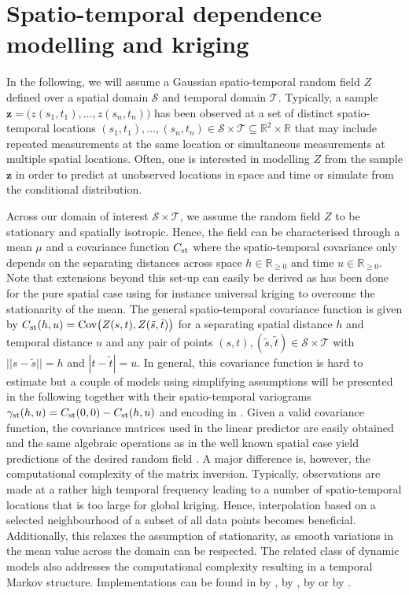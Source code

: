 \section{Spatio-temporal dependence modelling and kriging}\label{sec:theory}

In the following, we will assume a Gaussian spatio-temporal random field $Z$ defined over a spatial domain $\mathcal{S}$ and temporal domain $\mathcal{T}$. Typically, a sample $\mathbf{z} = \big(z(s_1,t_1),\dots,z(s_n,t_n)\big)$ has been observed at a set of distinct spatio-temporal locations $(s_1, t_1), \dots, (s_n,t_n) \in \mathcal{S}\times \mathcal{T} \subseteq \mathbb{R}^2 \times \mathbb{R}$ that may include repeated measurements at the same location or simultaneous measurements at multiple spatial locations. Often, one is interested in modelling $Z$ from the sample $\mathbf{z}$ in order to predict at unobserved locations in space and time or simulate from the conditional distribution.

Across our domain of interest $\mathcal{S} \times \mathcal{T}$, we assume the random field $Z$ to be stationary and spatially isotropic. Hence, the field can be characterised through a mean $\mu$ and a covariance function $C_{\rm st}$ where the spatio-temporal covariance only depends on the separating distances across space $h \in \mathbb{R}_{\geq 0}$ and time $u \in \mathbb{R}_{\geq 0}$. Note that extensions beyond this set-up can easily be derived as has been done for the pure spatial case using for instance universal kriging to overcome the stationarity of the mean. The general spatio-temporal covariance function is given by
$C_{\rm st}(h,u) = {\rm Cov}\big(Z(s,t), Z(\tilde{s},\tilde{t})\big)$ 
for a separating spatial distance $h$ and temporal distance $u$ and any pair of points $(s,t), (\tilde{s},\tilde{t}) \in \mathcal{S}\times\mathcal{T}$ with $||s-\tilde{s}||=h$ and $|t-\tilde{t}|=u$. In general, this covariance function is hard to estimate but a couple of models using simplifying assumptions will be presented in the following together with their spatio-temporal variograms $\gamma_{\rm st}(h,u) = C_{\rm st}(0,0)-C_{\rm st}(h,u)$ and encoding in . Given a valid covariance function, the covariance matrices used in the linear predictor are easily obtained and the same algebraic operations as in the well known spatial case yield predictions of the desired random field \citep{Cressie2011}. A major difference is, however, the computational complexity of the matrix inversion. Typically, observations are made at a rather high temporal frequency leading to a number of spatio-temporal locations that is too large for global kriging. Hence, interpolation based on a selected neighbourhood of a subset of all data points becomes beneficial. Additionally, this relaxes the assumption of stationarity, as smooth variations in the mean value across the domain can be respected. The related class of dynamic models also addresses the computational complexity resulting in a temporal Markov structure. Implementations can be found in  by \citet{bakar2015},  by \citet{finley2015},  by \citet{sigrist2015} or  by \citet{lindgren2015}.

